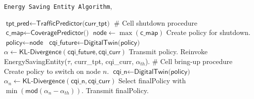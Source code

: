 \begin{algorithm} [t!]
    \caption{
        \texttt{Energy Saving Entity Algorithm},
    }
    \begin{algorithmic} [1]
            \State $\textsf{tpt\_pred} \gets \textsf{TrafficPredictor(curr\_tpt)}$
                \State \# Cell shutdown procedure
                \State $\textsf{c\_map} \gets \textsf{CoveragePredictor()}$
                \State $\textsf{node} \gets \max(\textsf{c\_map})$ 
                \State Create \textsf{policy} for shutdown.
                \State $\textsf{policy} \gets \textsf{node}$
                \State $\textsf{cqi\_future} \gets \textsf{DigitalTwin(policy)}$
                \State $\alpha \gets \textsf{KL-Divergence}(\textsf{cqi\_future}, \textsf{cqi\_curr})$
                    \State Transmit \textsf{policy}.
                \Else
                    \State Reinvoke \textsf{EnergySavingEntity($\tau$, curr\_tpt, cqi\_curr, $\alpha_{th}$)}.
                \EndIf
            \Else
                \State \# Cell bring-up procedure
                    \State Create \textsf{policy} to switch on node $n$.
                    \State $\textsf{cqi\_n} \gets \textsf{DigitalTwin(policy)}$
                    \State $\alpha_{n} \gets \textsf{KL-Divergence}(\textsf{cqi\_n}, \textsf{cqi\_curr})$
                \EndFor
                \State Select \textsf{finalPolicy} with $\min \left(\textsf{mod}(\alpha_{n} - \alpha_{th})\right)$.
                \State Transmit \textsf{finalPolicy}.
            \EndIf
        \EndProcedure
    \end{algorithmic}
    \label{alg:energy_saving_algo}
\end{algorithm}